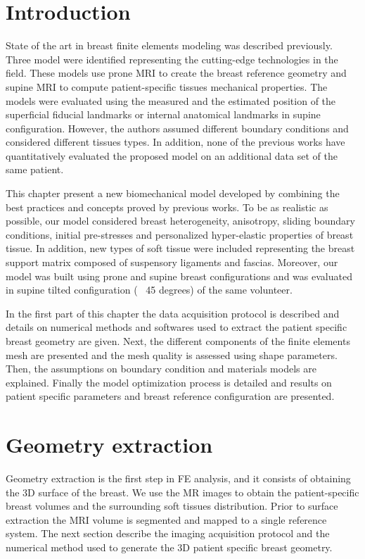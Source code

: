 \section{Introduction}\label{setion:introductionMyBioMecaModel}
State of the art in breast finite elements modeling was described previously. Three model were identified representing the cutting-edge  technologies in the field. These models use prone MRI to create the breast reference geometry and supine MRI to compute patient-specific tissues mechanical properties. The models were evaluated using  the measured and the estimated position of the superficial fiducial landmarks or internal anatomical landmarks in supine configuration.   However, the authors assumed different boundary conditions and considered different tissues types.  
In addition, none of the previous works have quantitatively evaluated the proposed model on an additional data set of the same patient. 

 This chapter present a new biomechanical model developed by combining the best practices and concepts proved by previous works. To be as realistic as possible, our model considered breast heterogeneity, anisotropy, sliding boundary conditions, initial pre-stresses and personalized hyper-elastic properties of breast tissue. In addition, new types of soft tissue were included representing the breast support matrix composed of suspensory ligaments and fascias. Moreover, our model was built using prone and supine breast configurations and was evaluated in supine tilted configuration (~ 45 degrees) of the same volunteer.

In the first part of this chapter the data acquisition protocol is described and details on numerical methods and softwares used to extract the patient specific breast geometry are given. Next, the different components of the finite elements mesh are presented and the mesh quality is assessed using shape parameters.  Then, the assumptions on boundary condition and materials models are explained. Finally the model optimization process is detailed and results on patient specific parameters and breast reference configuration are presented.   
\clearpage
\section{Geometry extraction}\label{section:geometryextraction}

Geometry extraction is the first step in FE analysis, and it
consists of obtaining the 3D surface of the
breast. We use the MR images to obtain the patient-specific breast volumes and the surrounding soft tissues distribution. Prior to surface extraction the MRI volume is segmented and mapped to a single reference system. The next section describe the imaging acquisition protocol and the numerical method used to generate the 3D patient specific breast geometry.

